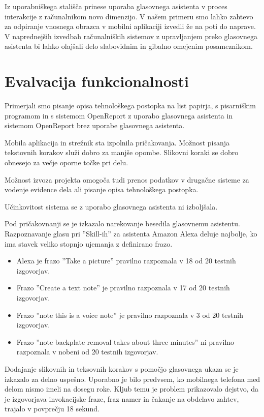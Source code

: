 \documentclass[a4paper, 12pt]{book}
\begin{document}
Iz uporabniškega stališča prinese uporaba glasovnega asistenta v proces interakcije z računalnikom novo dimenzijo.
V našem primeru smo lahko zahtevo za odpiranje vnosnega obrazca v mobilni aplikaciji izvedli že na poti do naprave.
V naprednejših izvedbah računalniških sistemov z upravljanjem preko glasovnega asistenta bi lahko olajšali delo slabovidnim in gibalno omejenim posameznikom.



\section{Evalvacija funkcionalnosti}

Primerjali smo pisanje opisa tehnološkega postopka na list papirja, s pisarniškim programom in s sistemom OpenReport z uporabo glasovnega asistenta in sistemom OpenReport brez uporabe glasovnega asistenta.

Mobila aplikacija in strežnik sta izpolnila pričakovanja.
Možnost pisanja tekstovnih korakov služi dobro za manjše opombe.
Slikovni koraki se dobro obnesejo za večje oporne točke pri delu.

Možnost izvoza projekta omogoča tudi prenos podatkov v drugačne sisteme za vodenje evidence dela ali pisanje opisa tehnološkega postopka.

Učinkovitost sistema se z uporabo glasovnega asistenta ni izboljšala.

Pod pričakovnanji se je izkazalo narekovanje besedila glasovnemu asistentu.
Razpoznavanje glasu pri ''Skill-ih'' za asistenta Amazon Alexa deluje najbolje, ko ima stavek veliko stopnjo ujemanja z definirano frazo.
\begin{itemize}
	\item Alexa je frazo ''Take a picture'' pravilno razpoznala v 18 od 20 testnih izgovorjav.
	\item Frazo ''Create a text note'' je pravilno razpoznala v 17 od 20 testnih izgovorjav.
	\item Frazo ''note this is a voice note'' je pravilno razpoznala v 3 od 20 testnih izgovorjav.
	\item Frazo ''note backplate removal takes about three minutes'' ni pravilno razpoznala v nobeni od 20 testnih izgovorjav.
\end{itemize}

Dodajanje slikovnih in teksovnih korakov s pomočjo glasovnega ukaza se je izkazalo za delno uspešno.
Uporabno je bilo predvsem, ko mobilnega telefona med delom nismo imeli na dosegu roke.
Kljub temu je problem prikazovalo dejstvo, da je izgovorjava invokacijske fraze, fraz namer in čakanje na obdelavo zahtev, trajalo v povprečju 18 sekund.
\end{document}
